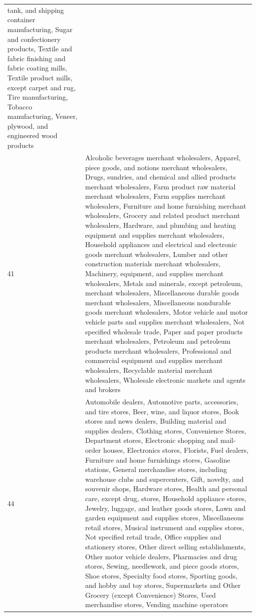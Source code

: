 \begin{longtable}{lp{18cm}}
tank, and shipping container manufacturing, Sugar and confectionery products, Textile and fabric finishing and fabric coating mills, Textile product mills, except carpet and rug, Tire manufacturing, Tobacco manufacturing, Veneer, plywood, and engineered wood products \\ 
  41 & Alcoholic beverages merchant wholesalers, Apparel, piece goods, and notions merchant wholesalers, Drugs, sundries, and chemical and allied products merchant  wholesalers, Farm product raw material merchant wholesalers, Farm supplies merchant wholesalers, Furniture and home furnishing merchant wholesalers, Grocery and related product merchant wholesalers, Hardware, and plumbing and heating equipment and supplies merchant wholesalers, Household appliances and electrical and electronic goods merchant wholesalers, Lumber and other construction materials merchant wholesalers, Machinery, equipment, and supplies merchant wholesalers, Metals and minerals, except petroleum, merchant wholesalers, Miscellaneous durable goods merchant wholesalers, Miscellaneous nondurable goods merchant wholesalers, Motor vehicle and motor vehicle parts and supplies merchant wholesalers, Not specified wholesale trade, Paper and paper products merchant wholesalers, Petroleum and petroleum products merchant wholesalers, Professional and commercial equipment and supplies merchant wholesalers, Recyclable material merchant wholesalers, Wholesale electronic markets and agents and brokers \\ 
  44 & Automobile dealers, Automotive parts, accessories, and tire stores, Beer, wine, and liquor stores, Book stores and news dealers, Building material and supplies dealers, Clothing stores, Convenience Stores, Department stores, Electronic shopping and mail-order houses, Electronics stores, Florists, Fuel dealers, Furniture and home furnishings stores, Gasoline stations, General merchandise stores, including warehouse clubs and supercenters, Gift, novelty, and souvenir shops, Hardware stores, Health and personal care, except drug, stores, Household appliance stores, Jewelry, luggage, and leather goods stores, Lawn and garden equipment and supplies stores, Miscellaneous retail stores, Musical instrument and supplies stores, Not specified retail trade, Office supplies and stationery stores, Other direct selling establishments, Other motor vehicle dealers, Pharmacies and drug stores, Sewing, needlework, and piece goods stores, Shoe stores, Specialty food stores, Sporting goods, and hobby and toy stores, Supermarkets and Other Grocery (except Convenience) Stores, Used merchandise stores, Vending machine operators \\ 

\end{longtable}
